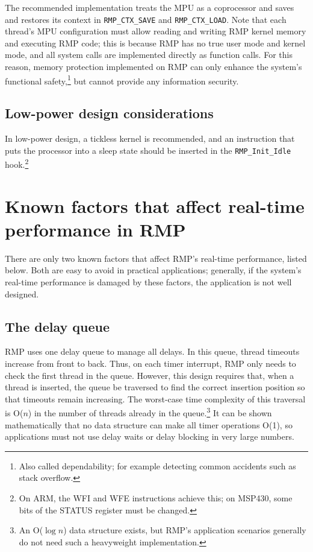The recommended implementation treats the MPU as a coprocessor and saves and restores its context in \texttt{RMP\_CTX\_SAVE} and \texttt{RMP\_CTX\_LOAD}.
Note that each thread's MPU configuration must allow reading and writing RMP kernel memory and executing RMP code; this is because RMP has no true user mode and kernel mode, and all system calls are implemented directly as function calls.
For this reason, memory protection implemented on RMP can only enhance the system's functional safety,\footnote{Also called dependability; for example detecting common accidents such as stack overflow.} but cannot provide any information security.

\subsection{Low-power design considerations}

In low-power design, a tickless kernel is recommended, and an instruction that puts the processor into a sleep state should be inserted in the \texttt{RMP\_Init\_Idle} hook.\footnote{On ARM, the WFI and WFE instructions achieve this; on MSP430, some bits of the STATUS register must be changed.}

\section{Known factors that affect real-time performance in RMP}

There are only two known factors that affect RMP's real-time performance, listed below.
Both are easy to avoid in practical applications; generally, if the system's real-time performance is damaged by these factors, the application is not well designed.

\subsection{The delay queue}

RMP uses one delay queue to manage all delays.
In this queue, thread timeouts increase from front to back.
Thus, on each timer interrupt, RMP only needs to check the first thread in the queue.
However, this design requires that, when a thread is inserted, the queue be traversed to find the correct insertion position so that timeouts remain increasing.
The worst-case time complexity of this traversal is O(\(n\)) in the number of threads already in the queue.\footnote{An O(\(\log n\)) data structure exists, but RMP's application scenarios generally do not need such a heavyweight implementation.}
It can be shown mathematically that no data structure can make all timer operations O(1), so applications must not use delay waits or delay blocking in very large numbers.

